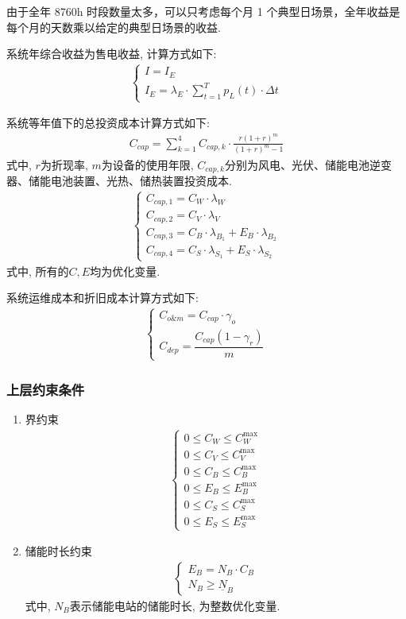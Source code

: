 \documentclass{article}
\begin{document}
{\color{red}由于全年 8760h 时段数量太多，可以只考虑每个月 1 个典型日场景，全年收益是每个月的天数乘以给定的典型日场景的收益.}

系统年综合收益为售电收益, 计算方式如下:
\begin{align}
    \begin{cases}
        I=I_E\\
        I_{E}=\lambda_{E}\cdot\sum\limits_{t=1}^{T}p_{L}(t){\cdot}\Delta t
    \end{cases}
\end{align}

系统等年值下的总投资成本计算方式如下:
\begin{align}
    C_{cap}=\sum_{k=1}^4C_{cap,k}\cdot\frac{r(1+r)^m}{(1+r)^m-1}
\end{align}
式中, $r$为折现率, $m$为设备的使用年限, $C_{cap,k}$分别为风电、光伏、储能电池逆变器、储能电池装置、光热、储热装置投资成本.
\begin{align}
    \begin{cases}C_{cap,1}=C_W\cdot\lambda_W\\C_{cap,2}=C_V\cdot\lambda_V\\C_{cap,3}=C_B\cdot\lambda_{B_1}+E_B\cdot\lambda_{B_2}\\C_{cap,4}=C_S\cdot\lambda_{S_1}+E_S\cdot\lambda_{S_2}\end{cases}
\end{align}
式中, 所有的$C, E$均为优化变量.

系统运维成本和折旧成本计算方式如下:
\begin{align}
    \begin{cases}C_{o\&m}=C_{cap}\cdot\gamma_o\\C_{dep}=\dfrac{C_{cap}(1-\gamma_r)}m\end{cases}
\end{align}


\subsubsection{上层约束条件}
\begin{enumerate}
    \item 界约束
    \begin{align}
        \begin{cases}0\le C_W\le C_W^{\max}\\0\le C_V\le C_V^{\max}\\0\le C_B\le C_B^{\max}\\0\le E_B\le E_B^{\max}\\0\le C_S\le C_S^{\max}\\0\le E_S\le E_S^{\max}\end{cases}
    \end{align}
    \item {\color{red}储能时长约束}
    \begin{align}
        \begin{cases}E_B=N_B\cdot C_B\\N_B\geq\underline{N}_B\end{cases}
    \end{align}
    式中, $N_B$表示储能电站的储能时长, 为整数优化变量.
\end{enumerate}
\end{document}

